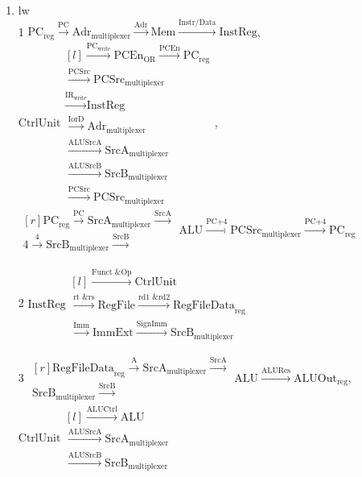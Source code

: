 \documentclass{article}
\begin{document}
\begin{enumerate}
    \item lw\\
1 $\text{PC}_\text{reg} \xrightarrow{\text{PC}} \text{Adr}_\text{multiplexer} \xrightarrow{\text{Adr}} \text{Mem} \xrightarrow{\text{Instr/Data}} \text{InstReg}$, $\text{CtrlUnit} \begin{matrix*}[l] 
\xrightarrow{\text{PC}_\text{write}} \text{PCEn}_\text{OR} \xrightarrow{\text{PCEn}} \text{PC}_\text{reg} \\ 
\xrightarrow{\text{PCSrc}} \text{PCSrc}_\text{multiplexer} \\
\xrightarrow{\text{IR}_\text{write}} \text{InstReg} \\
\xrightarrow{\text{IorD}} \text{Adr}_\text{multiplexer} \\ \xrightarrow{\text{ALUSrcA}} \text{SrcA}_\text{multiplexer} \\ \xrightarrow{\text{ALUSrcB}} \text{SrcB}_\text{multiplexer} \\ \xrightarrow{\text{PCSrc}} \text{PCSrc}_\text{multiplexer} \end{matrix*}$,\\ $\begin{matrix*}[r] \text{PC}_\text{reg} \xrightarrow{\text{PC}} \text{SrcA}_\text{multiplexer} \xrightarrow{\text{SrcA}} \\ \text{4} \xrightarrow{\text{4}} \text{SrcB}_\text{multiplexer} \xrightarrow{\text{SrcB}}\end{matrix*} \text{ALU} \xrightarrow{\text{PC+4}} \text{PCSrc}_\text{multiplexer} \xrightarrow{\text{PC+4}} \text{PC}_\text{reg}$\\

\bigbreak

2 $\text{InstReg} \begin{matrix*}[l] 
\xrightarrow{\text{Funct \& Op}} \text{CtrlUnit} \\ \xrightarrow{\text{rt \& rs}} \text{RegFile} \xrightarrow{\text{rd1 \& rd2}} \text{RegFileData}_\text{reg} \\
\xrightarrow{\text{Imm}} \text{ImmExt} \xrightarrow{\text{SignImm}} \text{SrcB}_\text{multiplexer} \end{matrix*}$\\

\bigbreak

3 $\begin{matrix*}[r] \text{RegFileData}_\text{reg} \xrightarrow{\text{A}} \text{SrcA}_\text{multiplexer} \xrightarrow{\text{SrcA}} \\ \text{SrcB}_\text{multiplexer} \xrightarrow{\text{SrcB}}\end{matrix*} \text{ALU} \xrightarrow{\text{ALURes}} \text{ALUOut}_\text{reg}$, $\text{CtrlUnit} \begin{matrix*}[l] 
\xrightarrow{\text{ALUCtrl}} \text{ALU} \\ \xrightarrow{\text{ALUSrcA}} \text{SrcA}_\text{multiplexer} \\ \xrightarrow{\text{ALUSrcB}} \text{SrcB}_\text{multiplexer} \end{matrix*}$


\end{enumerate}
\end{document}
